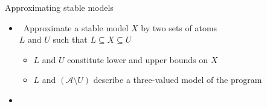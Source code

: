 \begin{frame}{Approximating stable models}
  \medskip
  \begin{itemize}
  \item {} \ Approximate a stable model $X$ by two sets of atoms\\
    $L$ and $U$ such that
    \(
    L\subseteq X\subseteq U
    \)
    \begin{itemize}\normalsize
    \item  $L$ and $U$ constitute lower and upper bounds on $X$
    \item  $L$ and $(\mathcal{A}\setminus U)$ describe a three-valued model of the program
    \end{itemize}
    \smallskip
  \item {}
  \end{itemize}
\end{frame}
%

